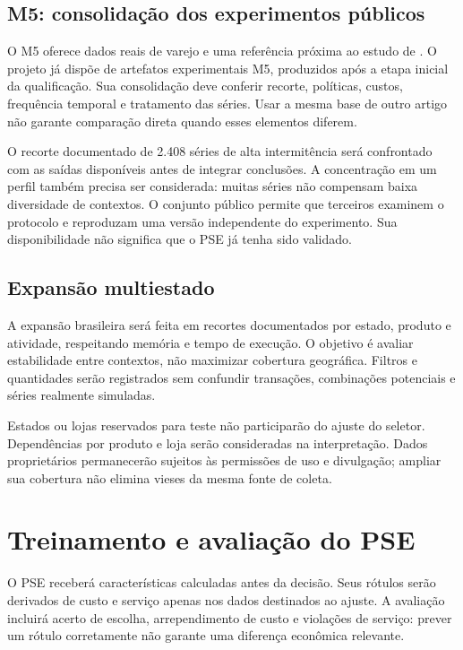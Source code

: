 \subsection{M5: consolidação dos experimentos públicos}

O M5 oferece dados reais de varejo e uma referência próxima ao estudo de \citet{Zabraoui2025GaDQN}. O projeto já dispõe de artefatos experimentais M5, produzidos após a etapa inicial da qualificação. Sua consolidação deve conferir recorte, políticas, custos, frequência temporal e tratamento das séries. Usar a mesma base de outro artigo não garante comparação direta quando esses elementos diferem.

O recorte documentado de 2.408 séries de alta intermitência será confrontado com as saídas disponíveis antes de integrar conclusões. A concentração em um perfil também precisa ser considerada: muitas séries não compensam baixa diversidade de contextos. O conjunto público permite que terceiros examinem o protocolo e reproduzam uma versão independente do experimento. Sua disponibilidade não significa que o PSE já tenha sido validado.

\subsection{Expansão multiestado}

A expansão brasileira será feita em recortes documentados por estado, produto e atividade, respeitando memória e tempo de execução. O objetivo é avaliar estabilidade entre contextos, não maximizar cobertura geográfica. Filtros e quantidades serão registrados sem confundir transações, combinações potenciais e séries realmente simuladas.

Estados ou lojas reservados para teste não participarão do ajuste do seletor. Dependências por produto e loja serão consideradas na interpretação. Dados proprietários permanecerão sujeitos às permissões de uso e divulgação; ampliar sua cobertura não elimina vieses da mesma fonte de coleta.

\section{Treinamento e avaliação do PSE}

O PSE receberá características calculadas antes da decisão. Seus rótulos serão derivados de custo e serviço apenas nos dados destinados ao ajuste. A avaliação incluirá acerto de escolha, arrependimento de custo e violações de serviço: prever um rótulo corretamente não garante uma diferença econômica relevante.

